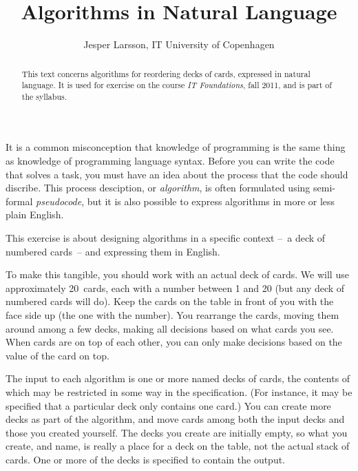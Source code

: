 \documentclass[nols,a4paper,twoside]{tufte-handout}
\title{Algorithms in Natural Language}
\author{Jesper Larsson, IT University of Copenhagen}
\date{}
\begin{document}
\maketitle

\begin{abstract}
  This text concerns algorithms for reordering decks of cards,
  expressed in natural language. It is used for exercise on the course
  \emph{IT Foundations}, fall 2011, and is part of the syllabus.
\end{abstract}

It is a common misconception that knowledge of programming is the same
thing as knowledge of programming language syntax. Before you can
write the code that solves a task, you must have an idea about the
process that the code should discribe. This process desciption, or
\emph{algorithm}, is often formulated using semi-formal
\emph{pseudocode}, but it is also possible to express algorithms in
more or less plain English.

This exercise is about designing algorithms in a specific context --~a
deck of numbered cards~-- and expressing them in English.

To make this tangible, you should work with an actual deck of
cards. We will use approximately 20~cards, each with a number between
1 and 20 (but any deck of numbered cards will do). Keep the cards on
the table in front of you with the face side up (the one with the
number). You rearrange the cards, moving them around among a
few decks, making all decisions based on what cards you see. When
cards are on top of each other, you can only make decisions based on
the value of the card on top.

The input to each algorithm is one or more named decks of cards, the
contents of which may be restricted in some way in the
specification. (For instance, it may be specified that a particular
deck only contains one card.) You can create more decks as part of the
algorithm, and move cards among both the input decks and those you
created yourself. The decks you create are initially empty, so what
you create, and name, is really a place for a deck on the table, not
the actual stack of cards. One or more of the decks is specified to
contain the output.
\end{document}
